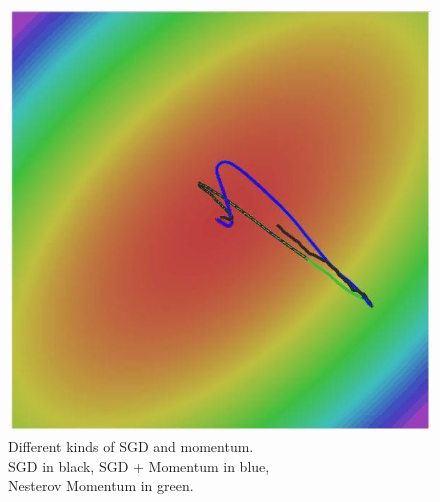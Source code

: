 \begin{minipage}{.5\linewidth}
    \begin{figure}[H]
        \centering
        \includegraphics[width=.9\linewidth]{images/momentum}
        \caption[Different kinds of SGD and momentum]{Different kinds of SGD and momentum.\\
            SGD in black, SGD + Momentum in blue,\\Nesterov Momentum in green.}
        \label{fig:momentum-1}
    \end{figure}
\end{minipage}
